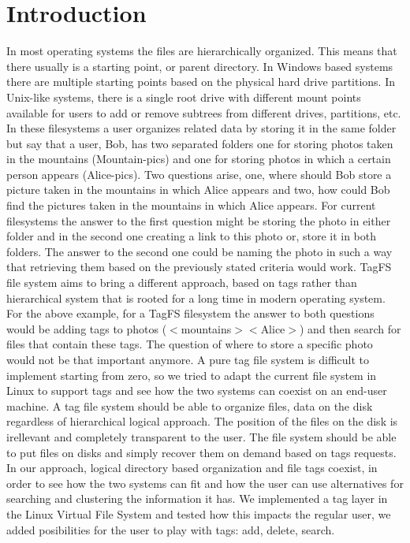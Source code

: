 \section{Introduction}
In most operating systems the files are hierarchically organized. 
This means that there usually is a starting point, or parent directory. 
In Windows based systems there are multiple starting points 
based on the physical hard drive partitions. In Unix-like systems, 
there is a single root drive with different mount points available for users
to add or remove subtrees from different drives, partitions, etc. 
In these filesystems a user organizes related data by storing it in the same 
folder but say that a user, Bob, has two separated folders one for storing
photos taken in the mountains (Mountain-pics) and one for storing photos in which 
a certain person appears (Alice-pics). Two questions arise, one, where should 
Bob store a picture taken in the mountains in which Alice appears and two, how 
could Bob find the pictures taken in the mountains in which Alice appears. For 
current
filesystems the answer to the first question might be storing the photo in either
folder and in the second one creating a link to this photo or, store it in both
folders. The answer to the second one could be naming the photo in such a way
that retrieving them based on the previously stated criteria would work. 
TagFS file system aims to bring a different approach, based on tags rather than 
hierarchical system that is rooted for a long time in modern operating system. 
For the above example, for a TagFS filesystem the answer to both questions would
be adding tags to photos ($<$mountains$><$Alice$>$) and then search for files that 
contain these tags. The question of where to store a specific photo 
 would not be that important anymore. 
A pure tag file system is difficult to implement starting from zero, so we tried
to adapt the current file system in Linux to support tags and see how the two 
systems can coexist on an end-user machine. 
A tag file system should be able to organize files, data on the disk regardless of 
hierarchical logical approach. The position of the files on the disk is irellevant and 
completely transparent to the user. The file system should be able to put files on disks
and simply recover them on demand based on tags requests. 
In our approach, logical directory based organization and file tags coexist, in order
to see how the two systems can fit and how the user can use alternatives for searching
and clustering the information it has. 
We implemented a tag layer in the Linux Virtual File System and tested how this impacts 
the regular user, we added posibilities for the user to play with tags: add, delete, search.

